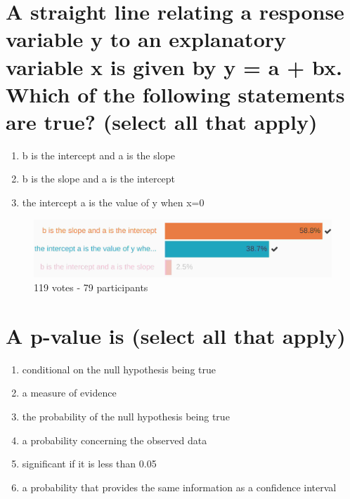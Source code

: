 \documentclass[letterpaper,10pt,twoside,printwatermark=false]{pinp}
\providecommand{\tightlist}{%
  \setlength{\itemsep}{0pt}\setlength{\parskip}{0pt}}
\begin{document}
\section{A straight line relating a response variable y to an
explanatory variable x is given by y = a + bx. Which of the following
statements are true? (select all that
apply)}\label{a-straight-line-relating-a-response-variable-y-to-an-explanatory-variable-x-is-given-by-y-a-bx.-which-of-the-following-statements-are-true-select-all-that-apply}

\begin{enumerate}
\def\labelenumi{\arabic{enumi}.}
\tightlist
\item
  b is the intercept and a is the slope
\item
  b is the slope and a is the intercept
\item
  the intercept a is the value of y when x=0
\end{enumerate}

\begin{figure}[H]
  \begin{center}
    \includegraphics[scale=0.15]{q8.jpg} 
  \end{center}
  \caption{119 votes - 79 participants}
\end{figure}

\newpage

\section{A p-value is (select all that
apply)}\label{a-p-value-is-select-all-that-apply}

\begin{enumerate}
\def\labelenumi{\arabic{enumi}.}
\tightlist
\item
  conditional on the null hypothesis being true
\item
  a measure of evidence
\item
  the probability of the null hypothesis being true
\item
  a probability concerning the observed data
\item
  significant if it is less than 0.05
\item
  a probability that provides the same information as a confidence
  interval
\end{enumerate}
\end{document}
